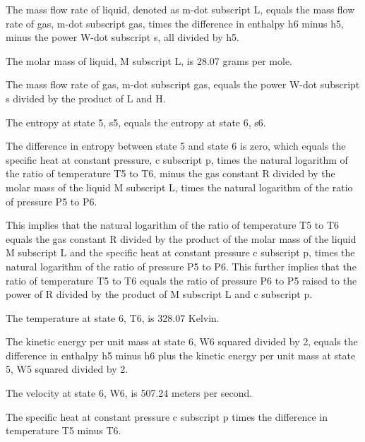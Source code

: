 The mass flow rate of liquid, denoted as m-dot subscript L, equals the mass flow rate of gas, m-dot subscript gas, times the difference in enthalpy h6 minus h5, minus the power W-dot subscript s, all divided by h5.

The molar mass of liquid, M subscript L, is 28.07 grams per mole.

The mass flow rate of gas, m-dot subscript gas, equals the power W-dot subscript s divided by the product of L and H.

The entropy at state 5, s5, equals the entropy at state 6, s6.

The difference in entropy between state 5 and state 6 is zero, which equals the specific heat at constant pressure, c subscript p, times the natural logarithm of the ratio of temperature T5 to T6, minus the gas constant R divided by the molar mass of the liquid M subscript L, times the natural logarithm of the ratio of pressure P5 to P6.

This implies that the natural logarithm of the ratio of temperature T5 to T6 equals the gas constant R divided by the product of the molar mass of the liquid M subscript L and the specific heat at constant pressure c subscript p, times the natural logarithm of the ratio of pressure P5 to P6. This further implies that the ratio of temperature T5 to T6 equals the ratio of pressure P6 to P5 raised to the power of R divided by the product of M subscript L and c subscript p.

The temperature at state 6, T6, is 328.07 Kelvin.

The kinetic energy per unit mass at state 6, W6 squared divided by 2, equals the difference in enthalpy h5 minus h6 plus the kinetic energy per unit mass at state 5, W5 squared divided by 2.

The velocity at state 6, W6, is 507.24 meters per second.

The specific heat at constant pressure c subscript p times the difference in temperature T5 minus T6.
